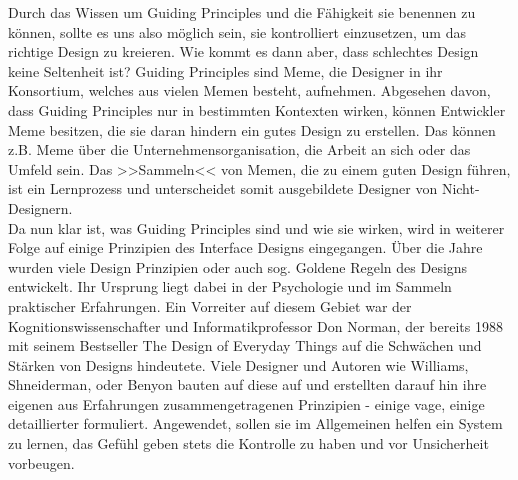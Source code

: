 Durch das Wissen um Guiding Principles und die Fähigkeit sie benennen zu können, sollte es uns also möglich sein, sie kontrolliert einzusetzen, um das richtige Design zu kreieren. Wie kommt es dann aber, dass schlechtes Design keine Seltenheit ist? Guiding Principles sind Meme, die Designer in ihr Konsortium, welches aus vielen Memen besteht, aufnehmen. Abgesehen davon, dass Guiding Principles nur in bestimmten Kontexten wirken, können Entwickler Meme besitzen, die sie daran hindern ein gutes Design zu erstellen. Das können z.B. Meme über die Unternehmensorganisation, die Arbeit an sich oder das Umfeld sein. Das >>Sammeln<< von Memen, die zu einem guten Design führen, ist ein Lernprozess und unterscheidet somit ausgebildete Designer von Nicht- Designern. \\
Da nun klar ist, was Guiding Principles sind und wie sie wirken, wird in weiterer Folge auf einige Prinzipien des Interface Designs eingegangen. Über die Jahre wurden viele Design Prinzipien oder auch sog. Goldene Regeln des Designs entwickelt. Ihr Ursprung liegt dabei in der Psychologie und im Sammeln praktischer Erfahrungen. Ein Vorreiter auf diesem Gebiet war der Kognitionswissenschafter und Informatikprofessor Don Norman, der bereits 1988 mit seinem Bestseller The Design of Everyday Things \citep{Norman:1988} auf die Schwächen und Stärken von Designs hindeutete. Viele Designer und Autoren wie Williams, Shneiderman, oder Benyon bauten auf diese auf und erstellten darauf hin ihre eigenen aus Erfahrungen zusammengetragenen Prinzipien - einige vage, einige detaillierter formuliert. Angewendet, sollen sie im Allgemeinen helfen ein System zu lernen, das Gefühl geben stets die Kontrolle zu haben und vor Unsicherheit vorbeugen.

